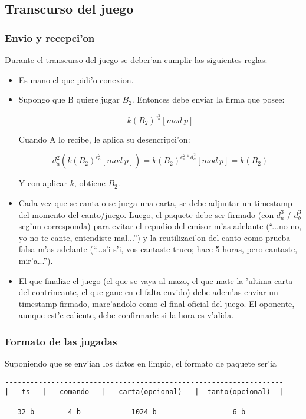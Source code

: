 \subsection{Transcurso del juego}
\subsubsection{Envio y recepci'on}
Durante el transcurso del juego se deber'an cumplir las siguientes reglas:

\begin{itemize}
\item Es mano el que pidi'o conexion.

\item Supongo que B quiere jugar $B_2$. Entonces debe enviar la firma que posee:

$$	k(B_2)^{e^2_a} [mod\ p] $$
	
Cuando A lo recibe, le aplica su desencripci'on:

$$	d^2_a(k(B_2)^{e^2_a} [mod\ p]) = 
	k(B_2)^{e^2_a * d^2_a} [mod\ p] = 
	k(B_2) $$

Y con aplicar $k$, obtiene $B_2$.

\item Cada vez que se canta o se juega una carta, se debe adjuntar un timestamp del momento del canto/juego. Luego, el paquete debe ser firmado (con $d^3_a$ / $d^3_b$ seg'un corresponda) para evitar el repudio del emisor m'as adelante (``...no no, yo no te cante, entendiste mal...'') y la reutilizaci'on del canto como prueba falsa m'as adelante (``...s'i s'i, vos cantaste truco; hace 5 horas, pero cantaste, mir'a...'').

\item El que finalize el juego (el que se vaya al mazo, el que mate la 'ultima carta del contrincante, el que gane en el falta envido) debe adem'as enviar un timestamp firmado, marc'andolo como el final oficial del juego. El oponente, aunque est'e caliente, debe confirmarle si la hora es v'alida.

\end{itemize}


\subsubsection{Formato de las jugadas}
Suponiendo que se env'ian los datos en limpio, el formato de paquete ser'ia

\begin{verbatim}
------------------------------------------------------------------
|   ts   |   comando   |   carta(opcional)   |  tanto(opcional)  |
------------------------------------------------------------------
   32 b        4 b            1024 b                  6 b
\end{verbatim}


